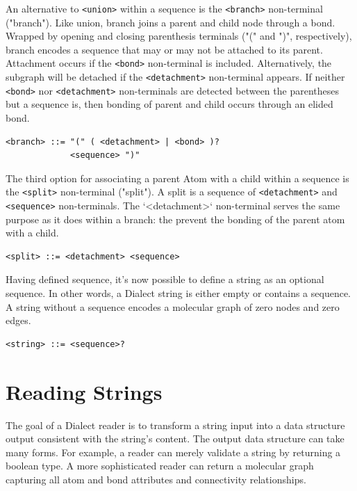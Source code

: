 \documentclass{article}
\def\ttt{\texttt}
\begin{document}
An alternative to \ttt{<union>} within a sequence is the \ttt{<branch>} non-terminal ("branch"). Like union, branch joins a parent and child node through a bond. Wrapped by opening and closing parenthesis terminals ("(" and ")", respectively), branch encodes a sequence that may or may not be attached to its parent. Attachment occurs if the \ttt{<bond>} non-terminal is included. Alternatively, the subgraph will be detached if the \ttt{<detachment>} non-terminal appears. If neither \ttt{<bond>} nor \ttt{<detachment>} non-terminals are detected between the parentheses but a sequence is, then bonding of parent and child occurs through an elided bond.

\begin{lstlisting}
<branch> ::= "(" ( <detachment> | <bond> )?
             <sequence> ")"
\end{lstlisting}

The third option for associating a parent Atom with a child within a sequence is the \ttt{<split>} non-terminal ("split"). A split is a sequence of \ttt{<detachment>} and \ttt{<sequence>} non-terminals. The `<detachment>` non-terminal serves the same purpose as it does within a branch: the prevent the bonding of the parent atom with a child.

\begin{lstlisting}
<split> ::= <detachment> <sequence>
\end{lstlisting}

Having defined sequence, it's now possible to define a string as an optional sequence. In other words, a Dialect string is either empty or contains a sequence. A string without a sequence encodes a molecular graph of zero nodes and zero edges.

\begin{lstlisting}
<string> ::= <sequence>?
\end{lstlisting}

\section*{Reading Strings}

The goal of a Dialect reader is to transform a string input into a data structure output consistent with the string's content. The output data structure can take many forms. For example, a reader can merely validate a string by returning a boolean type. A more sophisticated reader can return a molecular graph capturing all atom and bond attributes and connectivity relationships.
\end{document}
